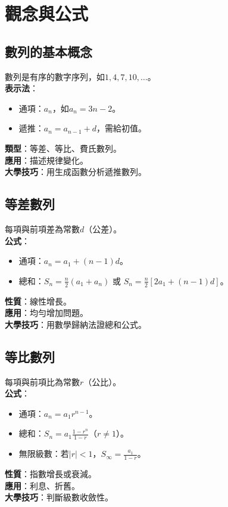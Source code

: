 
\section{觀念與公式}

\subsection{數列的基本概念}
數列是有序的數字序列，如$1, 4, 7, 10, \ldots$。\\
\textbf{表示法}：
\begin{itemize}
    \item 通項：$a_n$，如$a_n = 3n - 2$。
    \item 遞推：$a_n = a_{n-1} + d$，需給初值。
\end{itemize}
\textbf{類型}：等差、等比、費氏數列。\\
\textbf{應用}：描述規律變化。\\
\textbf{大學技巧}：用生成函數分析遞推數列。

\subsection{等差數列}
每項與前項差為常數$d$（公差）。\\
\textbf{公式}：
\begin{itemize}
    \item 通項：$a_n = a_1 + (n-1)d$。
    \item 總和：$S_n = \frac{n}{2} (a_1 + a_n)$ 或 $S_n = \frac{n}{2} [2a_1 + (n-1)d]$。
\end{itemize}
\textbf{性質}：線性增長。\\
\textbf{應用}：均勻增加問題。\\
\textbf{大學技巧}：用數學歸納法證總和公式。

\subsection{等比數列}
每項與前項比為常數$r$（公比）。\\
\textbf{公式}：
\begin{itemize}
    \item 通項：$a_n = a_1 r^{n-1}$。
    \item 總和：$S_n = a_1 \frac{1 - r^n}{1 - r}$（$r \neq 1$）。
    \item 無限級數：若$|r| < 1$，$S_\infty = \frac{a_1}{1 - r}$。
\end{itemize}
\textbf{性質}：指數增長或衰減。\\
\textbf{應用}：利息、折舊。\\
\textbf{大學技巧}：判斷級數收斂性。

